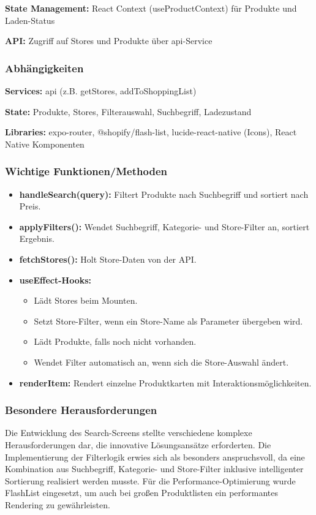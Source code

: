 \noindent\textbf{State Management:} React Context (useProductContext) für Produkte und Laden-Status

\noindent\textbf{API:} Zugriff auf Stores und Produkte über api-Service

\subsubsection{Abhängigkeiten}

\textbf{Services:} api (z.B. getStores, addToShoppingList)

\noindent\textbf{State:} Produkte, Stores, Filterauswahl, Suchbegriff, Ladezustand

\noindent\textbf{Libraries:} expo-router, @shopify/flash-list, lucide-react-native (Icons), React Native Komponenten

\subsubsection{Wichtige Funktionen/Methoden}
\begin{itemize}
    \item \textbf{handleSearch(query):} Filtert Produkte nach Suchbegriff und sortiert nach Preis.
    \item \textbf{applyFilters():} Wendet Suchbegriff, Kategorie- und Store-Filter an, sortiert Ergebnis.
    \item \textbf{fetchStores():} Holt Store-Daten von der API.
    \item \textbf{useEffect-Hooks:}
    \begin{itemize}
        \item Lädt Stores beim Mounten.
        \item Setzt Store-Filter, wenn ein Store-Name als Parameter übergeben wird.
        \item Lädt Produkte, falls noch nicht vorhanden.
        \item Wendet Filter automatisch an, wenn sich die Store-Auswahl ändert.
    \end{itemize}
    \item \textbf{renderItem:} Rendert einzelne Produktkarten mit Interaktionsmöglichkeiten.
\end{itemize}

\subsubsection{Besondere Herausforderungen}
Die Entwicklung des Search-Screens stellte verschiedene komplexe Herausforderungen dar, die innovative Lösungsansätze erforderten. Die Implementierung der Filterlogik erwies sich als besonders anspruchsvoll, da eine Kombination aus Suchbegriff, Kategorie- und Store-Filter inklusive intelligenter Sortierung realisiert werden musste. Für die Performance-Optimierung wurde FlashList eingesetzt, um auch bei großen Produktlisten ein performantes Rendering zu gewährleisten.

